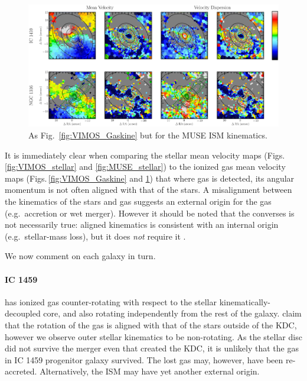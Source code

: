 	\begin{figure}
		\centering
		\includegraphics[height=0.31\textheight]{chapter5/muse/kin.png}
		\caption[MUSE ISM kinematic maps]{As Fig.\ \ref{fig:VIMOS_Gaskine} but for the MUSE ISM kinematics.}
		\label{fig:MUSE_Gaskine}
	\end{figure}


	It is immediately clear when comparing the stellar mean velocity maps (Figs.\,\ref{fig:VIMOS_stellar} and \ref{fig:MUSE_stellar}) to the ionized gas mean velocity maps (Figs.\,\ref{fig:VIMOS_Gaskine} and \ref{fig:MUSE_Gaskine}) that where gas is detected, its angular momentum is not often aligned with that of the stars. A misalignment between the kinematics of the stars and gas suggests an external origin for the gas (e.g.\ accretion or wet merger). However it should be noted that the converses is not necessarily true: aligned kinematics is consistent with an internal origin (e.g.\ stellar-mass loss), but it does \emph{not} require it \citep[e.g.][]{Davis2011a}. 

	We now comment on each galaxy in turn.

	\paragraph{IC 1459} has ionized gas counter-rotating with respect to the stellar kinematically-decoupled core, and also rotating independently from the rest of the galaxy. \citet{Franx1988} claim that the rotation of the gas is aligned with that of the stars outside of the KDC, however we observe outer stellar kinematics to be non-rotating. As the stellar disc did not survive the merger even that created the KDC, it is unlikely that the gas in IC 1459 progenitor galaxy survived. The lost gas may, however, have been re-accreted. Alternatively, the ISM may have yet another external origin. 

